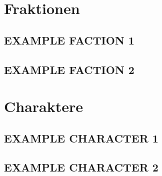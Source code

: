 
\section{Fraktionen}


\subsection{EXAMPLE FACTION 1}


\subsection{EXAMPLE FACTION 2}


\newpage

\section{Charaktere}


\subsection{EXAMPLE CHARACTER 1}

\subsection{EXAMPLE CHARACTER 2}
